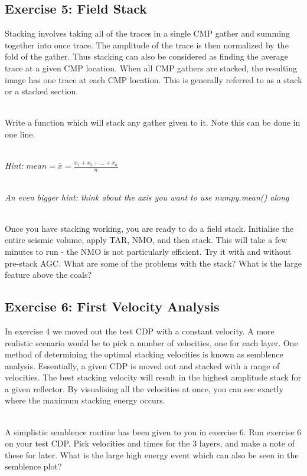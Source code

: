 \subsection*{Exercise 5: Field Stack}
Stacking involves taking all of the traces in a single CMP gather and summing together into once trace.  The amplitude of the trace is then normalized by the fold of the gather.  Thus stacking can also be considered as finding the average trace at a given CMP location.  When all CMP gathers are stacked, the resulting image has one trace at each CMP location.  This is generally referred to as a stack or a stacked section.
\par~\\
Write a function which will stack any gather given to it.  Note this can be done in one line. 
\par~\\
\emph{Hint: $mean = \bar{x} = \frac{x_1 + x_2 + \ldots + x_n}{n}$}
\par~\\
\emph{An even bigger hint: think about the axis you want to use numpy.mean() along}
\par~\\
Once you have stacking working, you are ready to do a field stack.  Initialise the entire seismic volume, apply TAR, NMO, and then stack.  This will take a few minutes to run - the NMO is not particularly efficient. Try it with and without pre-stack AGC. What are some of the problems with the stack? What is the large feature above the coals?
  

\subsection*{Exercise 6: First Velocity Analysis}
In exercise 4 we moved out the test CDP with a constant velocity.  A more realistic scenario would be to pick a number of velocities, one for each layer. One method of determining the optimal stacking velocities is known as semblence analysis.  Essentially, a given CDP is moved out and stacked with a range of velocities. The best stacking velocity will result in the highest amplitude stack for a given reflector.  By visualising all the velocities at once, you can see exactly where the maximum stacking energy occurs.
\par~\\
A simplistic semblence routine has been given to you in exercise 6. Run exercise 6 on your test CDP. Pick velocities and times for the 3 layers, and make a note of these for later.  What is the large high energy event which can also be seen in the semblence plot?

